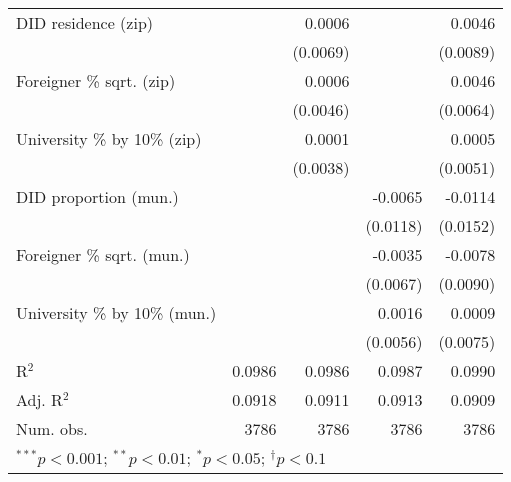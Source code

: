 \begin{tabular}{l D{.}{.}{4.11} D{.}{.}{4.11} D{.}{.}{4.11} D{.}{.}{4.11}}
DID residence (zip)               &                  & 0.0006           &                  & 0.0046           \\
                                  &                  & (0.0069)         &                  & (0.0089)         \\
Foreigner \% sqrt. (zip)          &                  & 0.0006           &                  & 0.0046           \\
                                  &                  & (0.0046)         &                  & (0.0064)         \\
University \% by 10\% (zip)       &                  & 0.0001           &                  & 0.0005           \\
                                  &                  & (0.0038)         &                  & (0.0051)         \\
DID proportion (mun.)             &                  &                  & -0.0065          & -0.0114          \\
                                  &                  &                  & (0.0118)         & (0.0152)         \\
Foreigner \% sqrt. (mun.)         &                  &                  & -0.0035          & -0.0078          \\
                                  &                  &                  & (0.0067)         & (0.0090)         \\
University \% by 10\% (mun.)      &                  &                  & 0.0016           & 0.0009           \\
                                  &                  &                  & (0.0056)         & (0.0075)         \\
\midrule
R$^2$                             & 0.0986           & 0.0986           & 0.0987           & 0.0990           \\
Adj. R$^2$                        & 0.0918           & 0.0911           & 0.0913           & 0.0909           \\
Num. obs.                         & 3786             & 3786             & 3786             & 3786             \\
\bottomrule
{}
\end{tabular}
